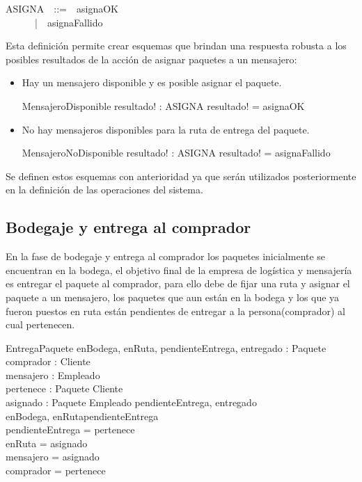 \documentclass[12pt,a4paper]{article}
\begin{document}
\begin{zed}
ASIGNA~~::=~~asignaOK\\
~~~~~~|~~asignaFallido
\end{zed}

Esta definición permite crear esquemas que brindan una respuesta robusta a los posibles resultados de la acción de asignar paquetes a un mensajero:
\begin{itemize}
\item Hay un mensajero disponible y es posible asignar el paquete.
\begin{schema}{MensajeroDisponible}
resultado! : ASIGNA
\where
resultado! = asignaOK
\end{schema}

\item No hay mensajeros disponibles para la ruta de entrega del paquete.
\begin{schema}{MensajeroNoDisponible}
resultado! : ASIGNA
\where
resultado! = asignaFallido
\end{schema}
\end{itemize} 

Se definen estos esquemas con anterioridad ya que serán utilizados posteriormente en la definición de las operaciones del sistema.

\subsection{Bodegaje y entrega al comprador}

En la fase de bodegaje y entrega al comprador los paquetes inicialmente se encuentran en la bodega, el objetivo final de la empresa de logística y mensajería es entregar el paquete al comprador, para ello debe de fijar una ruta y asignar el paquete a un mensajero, los paquetes que aun están en la bodega y los que ya fueron puestos en ruta están pendientes de entregar a la persona(comprador) al cual pertenecen.

\begin{schema}{EntregaPaquete}
enBodega, enRuta, pendienteEntrega, entregado : \power Paquete\\
comprador : \power Cliente\\ 
mensajero : \power Empleado\\
pertenece : Paquete \pfun Cliente\\
asignado : Paquete \pfun Empleado
\where
\disjoint \langle pendienteEntrega, entregado \rangle\\
\langle enBodega, enRuta\rangle \partition pendienteEntrega \\
pendienteEntrega = \dom pertenece \\
enRuta = \dom asignado\\
mensajero = \ran asignado\\
comprador = \ran pertenece
\end{schema}
\end{document}
